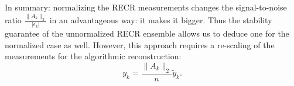 In summary: normalizing the RECR measurements changes the signal-to-noise ratio $\frac{ \|  A_k \|_2}{| \epsilon_k|}$ in an advantageous way: it makes it bigger. Thus the stability guarantee of the unnormalized RECR ensemble allows us to deduce one for the normalized case as well. However, this approach requires a re-scaling of the measurements for the algorithmic reconstruction:
\[
  y_k = \frac{ \|  A_k \|_2}{n} \tilde{y}_k.
\]
